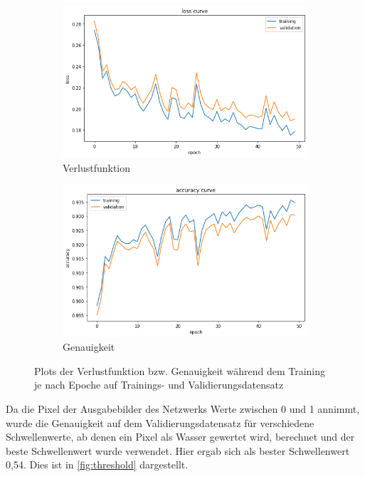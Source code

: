 \begin{figure}
    \centering
    \begin{subfigure}{0.45\textwidth}
        \centering
        \includegraphics[width=\textwidth]{images/loss_curve.png}
        \caption{Verlustfunktion}
        \label{fig:loss_curve}
    \end{subfigure}
    \begin{subfigure}{0.45\textwidth}
        \centering
        \includegraphics[width=\textwidth]{images/acc_curve.png}
        \caption{Genauigkeit}
        \label{fig:acc_curve}
    \end{subfigure}
    \caption{Plots der Verlustfunktion bzw. Genauigkeit während dem Training je nach Epoche auf Trainings- und Validierungsdatensatz}
    \label{fig:train_hist}
\end{figure}

Da die Pixel der Ausgabebilder des Netzwerks Werte zwischen 0 und 1 annimmt, wurde die Genauigkeit auf dem Validierungsdatensatz
für verschiedene Schwellenwerte, ab denen ein Pixel als Wasser gewertet wird, berechnet und der beste Schwellenwert wurde verwendet.
Hier ergab sich als bester Schwellenwert 0,54.
Dies ist in \autoref{fig:threshold} dargestellt.

